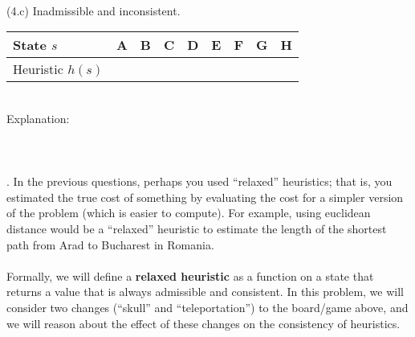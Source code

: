 \documentclass{article}
\begin{document}
~\\
(4.c) Inadmissible and inconsistent.
\renewcommand\arraystretch{1.5}
\begin{table}[tbh!]
\begin{center}
    \begin{tabular}{|p{2cm}| p{1cm}| p{1cm} | p{1cm}| p{1cm} | p{1cm}| p{1cm} | p{1cm}| p{1cm}|}
\hline
    State $s$  & A & B & C & D & E & F & G & H \\ \hline
    Heuristic $h(s)$ &   &   &   &  &   &   &   &  \\
\hline
\end{tabular}
\end{center}
\end{table}
~\\
Explanation: 
~\\
~\\
~\\
~\\


\newpage
{}. In the previous questions, perhaps you used “relaxed” heuristics; that is, you estimated the true cost of something by evaluating the cost for a simpler version of the problem (which is easier to compute). For example, using euclidean distance would be a ``relaxed'' heuristic to estimate the length of the shortest path from Arad to Bucharest in Romania.\\
~\\
Formally, we will define a \textbf{relaxed heuristic} as a function on a state that returns a value that is always admissible and consistent. In this problem, we will consider two changes (``skull'' and ``teleportation'') to the board/game above, and we will reason about the effect of these changes on the consistency of heuristics.\\
\end{document}
